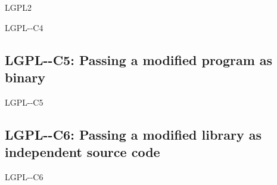 \begin{license}{LGPL2}
\begin{lsuc}{LGPL-\ver-C4}
  \lsucprohibitsnothing
\end{lsuc}

\subsection{LGPL-\ver-C5: Passing a modified program as binary}
\begin{lsuc}{LGPL-\ver-C5}

  \useCaseFive
  \coversFive

%

  \begin{lsucrequires}
    \lsucmandatory{\keepLicensingElements}
    \lsucmandatory{\lgpltwoEnsureCopyrightNoticeBinary}
    \lsucmandatory{\giveLicense}\passingFilesCorrectly
    \lsucmandatory{\markProgramModifications}
    \lsucmandatory{\arrangeProgramChanges}
    \lsucmandatory{\publishModifiedSource}
    \lsucmandatory{\describeHowToGetSource}  
    \lsucoptional{\createChangelog}  
    \lsucoptional{\addToDocumentation}
    \lsucoptional{\keepAllCopyrightNotices}
  \end{lsucrequires}

  \lsucprohibitsnothing
\end{lsuc}

\subsection{LGPL-\ver-C6: Passing a modified library as independent source code}
\begin{lsuc}{LGPL-\ver-C6}


\end{lsuc}
\end{license}
